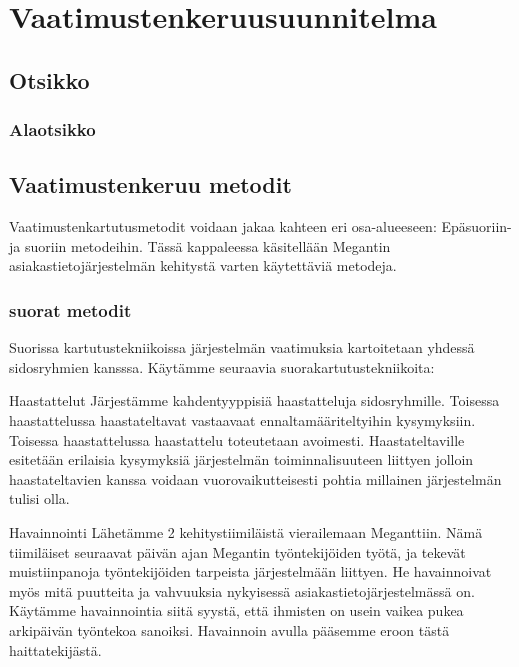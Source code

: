 \chapter{Vaatimustenkeruusuunnitelma} %
\label{keruu} %
\thispagestyle{fancy} %

\lipsum[1]

\section{Otsikko}  %

\lipsum

\subsection{Alaotsikko}

\lipsum[1-3]





\section{Vaatimustenkeruu metodit}
Vaatimustenkartutusmetodit voidaan jakaa kahteen eri osa-alueeseen: Epäsuoriin- ja suoriin metodeihin.
 Tässä kappaleessa käsitellään Megantin asiakastietojärjestelmän kehitystä varten käytettäviä metodeja.


 \subsection{suorat metodit}
 Suorissa kartutustekniikoissa järjestelmän vaatimuksia kartoitetaan yhdessä sidosryhmien kansssa.
 Käytämme seuraavia suorakartutustekniikoita:

 Haastattelut
 Järjestämme kahdentyyppisiä haastatteluja sidosryhmille. Toisessa haastattelussa haastateltavat vastaavaat ennaltamääriteltyihin kysymyksiin. 
 Toisessa haastattelussa haastattelu toteutetaan avoimesti. Haastateltaville esitetään erilaisia kysymyksiä järjestelmän toiminnalisuuteen liittyen jolloin
 haastateltavien kanssa voidaan vuorovaikutteisesti pohtia millainen järjestelmän tulisi olla.

Havainnointi
Lähetämme 2 kehitystiimiläistä vierailemaan  Meganttiin. Nämä tiimiläiset seuraavat päivän ajan Megantin työntekijöiden työtä, ja tekevät 
muistiinpanoja työntekijöiden tarpeista järjestelmään liittyen. He havainnoivat myös mitä puutteita ja vahvuuksia nykyisessä asiakastietojärjestelmässä on.
Käytämme havainnointia siitä syystä, että ihmisten on usein vaikea pukea arkipäivän työntekoa sanoiksi. Havainnoin avulla pääsemme eroon tästä haittatekijästä.


